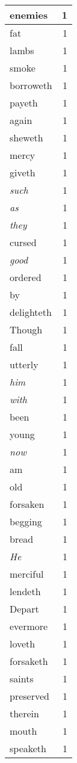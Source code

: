 \begin{center}
\begin{longtable}{l|r}
enemies & 1 \\ \hline
fat & 1 \\ \hline
lambs & 1 \\ \hline
smoke & 1 \\ \hline
borroweth & 1 \\ \hline
payeth & 1 \\ \hline
again & 1 \\ \hline
sheweth & 1 \\ \hline
mercy & 1 \\ \hline
giveth & 1 \\ \hline
\emph{such} & 1 \\ \hline
\emph{as} & 1 \\ \hline
\emph{they} & 1 \\ \hline
cursed & 1 \\ \hline
\emph{good} & 1 \\ \hline
ordered & 1 \\ \hline
by & 1 \\ \hline
delighteth & 1 \\ \hline
Though & 1 \\ \hline
fall & 1 \\ \hline
utterly & 1 \\ \hline
\emph{him} & 1 \\ \hline
\emph{with} & 1 \\ \hline
been & 1 \\ \hline
young & 1 \\ \hline
\emph{now} & 1 \\ \hline
am & 1 \\ \hline
old & 1 \\ \hline
forsaken & 1 \\ \hline
begging & 1 \\ \hline
bread & 1 \\ \hline
\emph{He} & 1 \\ \hline
merciful & 1 \\ \hline
lendeth & 1 \\ \hline
Depart & 1 \\ \hline
evermore & 1 \\ \hline
loveth & 1 \\ \hline
forsaketh & 1 \\ \hline
saints & 1 \\ \hline
preserved & 1 \\ \hline
therein & 1 \\ \hline
mouth & 1 \\ \hline
speaketh & 1 \\ \hline

\end{longtable}
\end{center}
